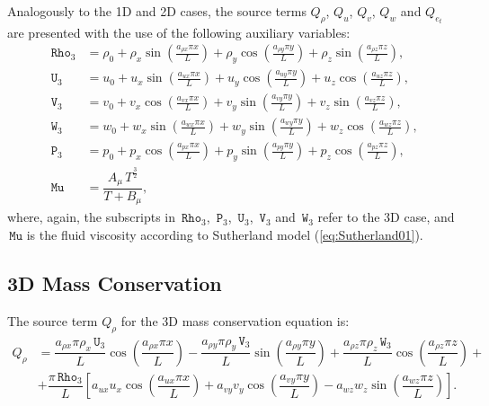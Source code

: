 \documentclass[10pt]{article}
\newcommand{\Rho}{\,\mathtt{Rho}}
\newcommand{\PP}{\,\mathtt{P}}
\newcommand{\U}{\,\mathtt{U}}
\newcommand{\V}{\,\mathtt{V}}
\newcommand{\W}{\,\mathtt{W}}
\newcommand{\MU}{\,\mathtt{Mu}}
\begin{document}
Analogously to the 1D and 2D cases, the source terms $Q_\rho$, $Q_u$, $Q_v$, $Q_w$ and $Q_{e_t}$ are  presented with the use of the following auxiliary variables:
\begin{equation*}
 \begin{split}
\label{eq:aux}
\Rho_3 &= \rho_{0}+ \rho_{x} \sin\left(\frac{a_{ \rho  x} \pi x}{L}\right)+ \rho_{y} \cos\left(\frac{a_{ \rho  y} \pi y}{L}\right) + \rho_{z} \sin\left(\frac{a_{ \rho  z} \pi z}{L}\right),\\
\U_3 &=u_{0}+u_{x} \sin\left(\frac{a_{u  x} \pi x}{L}\right)+u_{y} \cos\left(\frac{a_{u  y} \pi y}{L}\right)+u_{z} \cos\left(\frac{a_{u  z} \pi z}{L}\right) ,\\
\V_3 &= v_{0}+v_{x} \cos\left(\frac{a_{v  x} \pi x}{L}\right)+v_{y} \sin\left(\frac{a_{v  y} \pi y}{L}\right)+v_{z} \sin\left(\frac{a_{v  z} \pi z}{L}\right), \\
\W_3 &= w_{0}+w_{x} \sin\left(\frac{a_{w  x} \pi x}{L}\right)+w_{y} \sin\left(\frac{a_{w  y} \pi y}{L}\right)+ w_{z} \cos\left(\frac{a_{w  z} \pi z}{L}\right) ,\\
\PP_3 &= p_{0}+p_{x} \cos\left(\frac{a_{p  x} \pi x}{L}\right)+p_{y} \sin\left(\frac{a_{p  y} \pi y}{L}\right)+ p_{z} \cos\left(\frac{a_{p  z} \pi z}{L}\right),\\
\MU  &=\dfrac{A_\mu \, T^{\frac{3}{2}}}{T+B_\mu},
\end{split}
\end{equation*}
where, again, the subscripts in $\Rho_3$, $\PP_3$, $\U_3$, $\V_3$ and $\W_3$ refer to the 3D case, and $\MU$ is the fluid viscosity according to Sutherland model (\ref{eq:Sutherland01}).

\subsection{3D Mass Conservation}

The source term $Q_{\rho}$ for the 3D mass conservation equation is:
\begin{equation}
 \begin{split}
Q_\rho &=\dfrac{ a_{\rho x} \pi \rho_x \U_3}{L} \cos\left(\dfrac{a_{\rho x} \pi x}{L}\right)-\dfrac{a_{\rho y} \pi \rho_y \V_3 }{L}\sin\left(\dfrac{a_{\rho y} \pi y}{L}\right)+\dfrac{a_{\rho z} \pi \rho_z \W_3 }{L}\cos\left(\dfrac{a_{\rho z}\pi z }{L}\right)+\\
&+\dfrac{\pi \Rho_3}{L}\left[a_{ux} u_x \cos\left(\dfrac{a_{ux} \pi x}{L}\right)+a_{vy} v_y \cos\left(\dfrac{a_{vy} \pi y}{L}\right)-a_{wz} w_z \sin\left(\dfrac{a_{wz}\pi z }{L}\right)\right].
 \end{split}
\end{equation}
\end{document}
